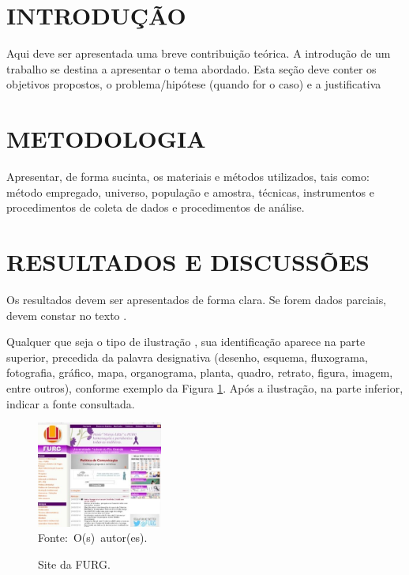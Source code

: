 \documentclass{furgmpu}
\begin{document}
    \maketitle
    
    
    \section{INTRODUÇÃO}
    Aqui deve ser apresentada uma breve contribuição teórica. A introdução de um trabalho se destina a apresentar o tema abordado. Esta seção deve conter os objetivos propostos, o problema/hipótese (quando for o caso) e a justificativa 

    \section{METODOLOGIA}
    Apresentar, de forma sucinta, os materiais e métodos utilizados, tais como: método empregado, universo, população e amostra, técnicas, instrumentos e procedimentos de coleta de dados e procedimentos de análise. 
    
    \section{RESULTADOS E DISCUSSÕES}
    Os resultados devem ser apresentados de forma clara. Se forem dados parciais, devem constar no texto \cite{exemplo01}.  
    
    Qualquer que seja o tipo de ilustração \cite{exemplo02}, sua identificação aparece na parte superior, precedida da palavra designativa (desenho, esquema, fluxograma, fotografia, gráfico, mapa, organograma, planta, quadro, retrato, figura, imagem, entre outros), conforme exemplo da Figura \ref{fig:exemplo}. Após a ilustração, na parte inferior, indicar a fonte consultada. 
    \begin{figure}[ht]
        \centering
        \caption{Site da FURG.}
        \includegraphics[width=4.13cm, scale=1]{exemplo.jpg} \\
        \mbox{Fonte: O(s) autor(es).}
        \label{fig:exemplo}
    \end{figure}
    
\end{document}

